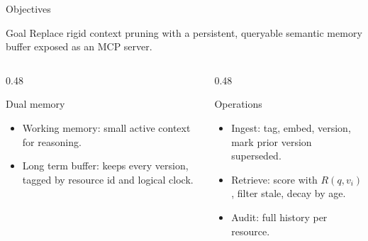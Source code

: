 \documentclass[aspectratio=169,10pt]{beamer}
\begin{document}
\begin{frame}{Objectives}
  \begin{block}{Goal}
    Replace rigid context pruning with a persistent, queryable semantic memory buffer exposed as an MCP server.
  \end{block}
  \begin{columns}[T,onlytextwidth]
    \begin{column}{0.48\textwidth}
      \begin{block}{Dual memory}
        \begin{itemize}
          \item Working memory: small active context for reasoning.
          \item Long term buffer: keeps every version, tagged by resource id and logical clock.
        \end{itemize}
      \end{block}
    \end{column}
    \begin{column}{0.48\textwidth}
      \begin{block}{Operations}
        \begin{itemize}
          \item Ingest: tag, embed, version, mark prior version superseded.
          \item Retrieve: score with $R(q,v_i)$, filter stale, decay by age.
          \item Audit: full history per resource.
        \end{itemize}
      \end{block}
    \end{column}
  \end{columns}
\end{frame}
\end{document}
